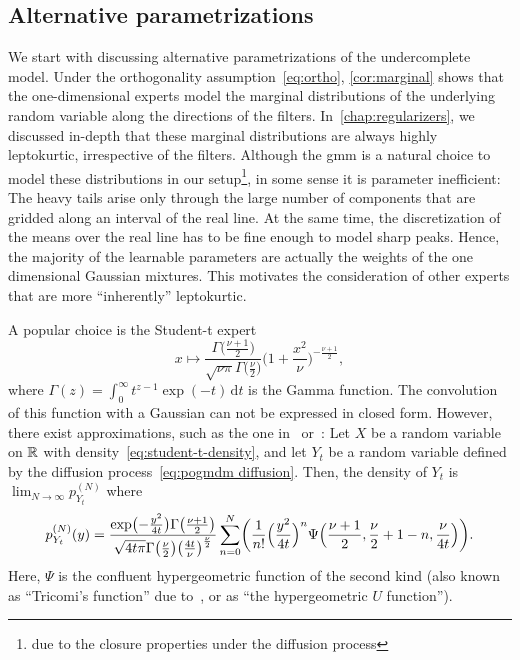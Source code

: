 \subsection{Alternative parametrizations}%
\label{ssec:alternative parametrizations}
We start with discussing alternative parametrizations of the undercomplete model.
Under the orthogonality assumption~\cref{eq:ortho}, \cref{cor:marginal} shows that the one-dimensional experts model the marginal distributions of the underlying random variable along the directions of the filters.
In~\cref{chap:regularizers}, we discussed in-depth that these marginal distributions are always highly leptokurtic, irrespective of the filters.
Although the \gls{gmm} is a natural choice to model these distributions in our setup\footnote{due to the closure properties under the diffusion process}, in some sense it is parameter inefficient:
The heavy tails arise only through the large number of components that are gridded along an interval of the real line.
At the same time, the discretization of the means over the real line has to be fine enough to model sharp peaks.
Hence, the majority of the learnable parameters are actually the weights of the one dimensional Gaussian mixtures.
This motivates the consideration of other experts that are more \enquote{inherently} leptokurtic.

A popular choice is the Student-t expert~\cite{hinton_discovering_2001,RoBl09}
\begin{equation}
	x \mapsto \frac{\Gamma\bigl( \frac{\nu + \num{1}}{\num{2}} \bigr)}{\sqrt{\nu\pi}\Gamma\bigl(\frac{\nu}{\num{2}}\bigr)} \bigl( \num{1} +  \frac{x^{\num{2}}}{\nu} \bigr)^{-\frac{\nu + \num{1}}{\num{2}}},
	\label{eq:student-t-density}
\end{equation}
where \( \Gamma(z) = \int_{\num{0}}^\infty t^{z-\num{1}}\exp(-t)\,\mathrm{d}t \) is the Gamma function.
The convolution of this function with a Gaussian can not be expressed in closed form.
However, there exist approximations, such as the one in~\cite{forchini_distribution_2008} or~\cite[theorem 1]{berg2009density}:
Let \( X \) be a random variable on \( \mathbb{R} \) with density~\cref{eq:student-t-density}, and let \( Y_t \) be a random variable defined by the diffusion process~\cref{eq:pogmdm diffusion}.
Then, the density of \( Y_t \) is \( \lim_{N\to \infty} p_{Y_t}^{(N)} \) where
\begin{equation}
	p_{Y_t}^{(N)}(y) = \frac{\exp \bigl( -\frac{y^{\num{2}}}{\num{4}t} \bigr)\Gamma\bigl( \frac{\nu + \num{1}}{\num{2}} \bigr)}{\sqrt{\num{4}t\pi}\Gamma\bigl(\frac{\nu}{\num{2}}\bigr) \bigl( \frac{\num{4}t}{\nu} \bigr)^{\frac{\nu}{\num{2}}}} \sum_{n=\num{0}}^{N}\biggl( \frac{\num{1}}{n!} \Bigl( \frac{y^{\num{2}}}{\num{4}t} \Bigr)^n \Psi\Bigl( \frac{\nu + \num{1}}{\num{2}}, \frac{\nu}{\num{2}} + \num{1} - n, \frac{\nu}{\num{4}t} \Bigr) \biggr).
	\label{eq:forchini}
\end{equation}
Here, \( \Psi \) is the confluent hypergeometric function of the second kind (also known as \enquote{Tricomi's function} due to~\cite{Tricomi1947}, or as \enquote{the hypergeometric \( U \) function}).

